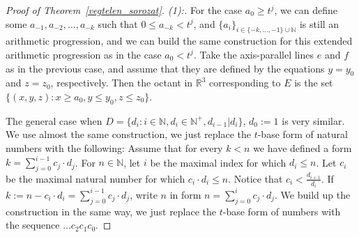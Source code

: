 \documentclass[10pt,a4paper]{amsart}
\newcommand{\N}{\mathbb{N}}
\begin{document}
\begin{proof}[Proof of Theorem~\ref{vegtelen_sorozat}. (1):]
    For the case $a_0 \geq t^j$, we can define some $a_{-1}, a_{-2},...,a_{-k}$ such that $0\leq a_{-k} < t^j$, and $\{a_i\}_{i \in \{-k, ..., -1\} \cup \mathbb{N}}$ is still an arithmetic progression, and we can build the same construction for this extended arithmetic progression as in the case $a_0<t^j$. Take the axis-parallel lines $e$ and $f$ as in the previous case, and assume that they are defined by the equations $y=y_0$ and $z=z_0$, respectively. Then the octant in $\mathbb{R}^3$ corresponding to $E$ is the set $\{(x,y,z): x \geq a_0, y \leq y_0, z \leq z_0\}$. 
    
    The general case when $D = \{d_i: i\in\N, d_i \in \mathbb{N}^+, d_{i-1} | d_{i}\}$, $d_0:=1$ is very similar. We use almost the same construction, we just replace the $t$-base form of natural numbers with the following: Assume that for every $k<n$ we have defined a form $k = \sum\limits_{j=0}^{i-1} c_j \cdot d_j$. For $n \in \mathbb{N}$, let $i$ be the maximal index for which $d_i \leq n$. Let $c_i$ be the maximal natural number for which $c_i \cdot d_i \leq n$. Notice that $c_i<\frac{d_{i+1}}{d_i}$. If $k := n-c_i \cdot d_i = \sum\limits_{j=0}^{i-1} c_j \cdot d_j$, write $n$ in form $n = \sum\limits_{j=0}^{i} c_j \cdot d_j$. We build up the construction in the same way, we just replace the $t$-base form of numbers with the sequence $...c_2c_1c_0$.
    \end{proof}
\end{document}
